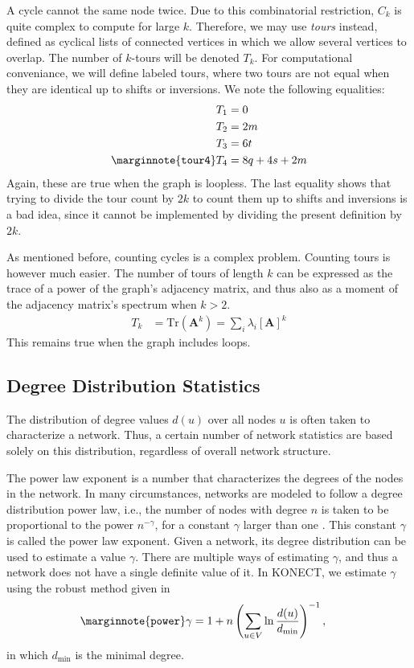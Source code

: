 \documentclass{article}
\begin{document}
A cycle cannot the same node twice.  Due to this combinatorial
restriction, $C_k$ is quite complex to compute for large $k$.
Therefore, we may use \emph{tours} instead, defined as cyclical lists of
connected vertices in which we allow several vertices to overlap.  The
number of $k$-tours will be denoted $T_k$.  For computational
conveniance, we will define labeled tours, where two tours are not equal
when they are identical up to shifts or inversions.  
We note the following equalities: 
\begin{align}
  T_1 &= 0 \nonumber \\
  T_2 &= 2m \nonumber \\
  T_3 &= 6t \nonumber \\
  \marginnote{\texttt{tour4}}
  T_4 &= 8q + 4s + 2m 
\end{align}
Again, these are true when the graph is loopless.  The last equality
shows that trying to divide the tour count by $2k$ to count them up to
shifts and inversions is a bad idea, since it cannot be implemented by
dividing the present definition by $2k$. 

As mentioned before, counting cycles is a complex problem.  Counting
tours is however much easier.  The number of tours of length $k$ can be
expressed as the trace of a power of the graph's adjacency matrix, and
thus also as a moment of the adjacency matrix's spectrum when $k > 2$.  
\begin{align*}
  T_k &= \mathrm{Tr}(\mathbf A^k) = \sum_i \lambda_i[\mathbf A]^k
\end{align*}
This remains true when the graph includes loops.  

\subsection{Degree Distribution Statistics}
The distribution of degree values $d(u)$ over all nodes $u$ is often
taken to characterize a network.  Thus, a certain number of network
statistics are based solely on this distribution, regardless of overall
network structure.

The power law exponent is a number that characterizes the degrees of the
nodes in the network.  In many circumstances, networks are modeled to
follow a degree distribution power law, i.e., the number of nodes with
degree $n$ is taken to be proportional to the power $n^{-\gamma}$, for a
constant $\gamma$ larger than one \citep{b439}.  This constant $\gamma$
is called the power law exponent.  Given a network, its degree
distribution can be used to estimate a value $\gamma$.  There are
multiple ways of estimating $\gamma$, and thus a network does not have a
single definite value of it. In KONECT, we estimate $\gamma$ using the
robust method given in \citep[Eq.~5]{b408}
\begin{align}
  \marginnote{\texttt{power}} \gamma &= 1 + n \left( \sum_{u\in V} \ln
  \frac {d(u)} {d_{\min}} \right) ^{-1},
\end{align}
in which $d_{\min}$ is the minimal degree.
\end{document}
